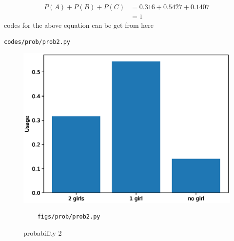 \begin{enumerate}[label=\arabic*.,ref=\thesubsection.\theenumi]
\begin{align}
P(A) + P(B) + P(C) &= 0.316 + 0.5427 + 0.1407
\\
&= 1
\end{align}
codes for the above equation can be get from here
\begin{lstlisting}
codes/prob/prob2.py
\end{lstlisting}
\begin{figure}[!ht]
	\centering
	\includegraphics[width=\columnwidth]{./figures/prob/prob2.eps}
	\caption{probability 2 }
	\label{fig:bt2}
	\begin{lstlisting}
	figs/prob/prob2.py
	\end{lstlisting}
\end{figure}
\end{enumerate}